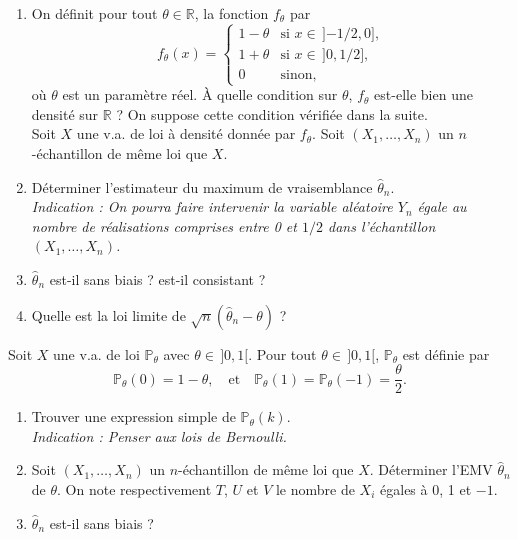 \begin{mdframed}
\begin{exercice}
\begin{enumerate}
    \item On définit pour tout $\theta \in \mathbb{R}$, la fonction $f_\theta$ par
    \begin{equation*}
    f_\theta(x) = \begin{cases}
    1 - \theta & \text{si } x \in \, ]{-1/2}, 0], \\
    1 + \theta & \text{si } x \in \, ]0, 1/2], \\
    0 & \text{sinon},
    \end{cases}
    \end{equation*}
    où $\theta$ est un paramètre réel. À quelle condition sur $\theta$, $f_\theta$ est-elle bien une densité sur $\mathbb{R}$ ? On suppose cette condition vérifiée dans la suite.\\
    Soit $X$ une v.a. de loi à densité donnée par $f_\theta$. Soit $(X_1, \dots, X_n)$ un $n$-échantillon de même loi que $X$.
    
    \item Déterminer l'estimateur du maximum de vraisemblance $\hat{\theta}_n$.\\
    \textit{Indication : On pourra faire intervenir la variable aléatoire $Y_n$ égale au nombre de réalisations comprises entre 0 et $1/2$ dans l'échantillon $(X_1, \dots, X_n)$.}
    
    \item $\hat{\theta}_n$ est-il sans biais ? est-il consistant ?
    \item Quelle est la loi limite de $\sqrt{n}(\hat{\theta}_n - \theta)$ ?
\end{enumerate}
\end{exercice}
\end{mdframed}

\smallskip

\begin{mdframed}
\begin{exercice}
Soit $X$ une v.a. de loi $\mathbb{P}_\theta$ avec $\theta \in \, ]0, 1[$. Pour tout $\theta \in \, ]0, 1[$, $\mathbb{P}_\theta$ est définie par
\begin{equation*}
\mathbb{P}_\theta(0) = 1 - \theta, \quad \text{et} \quad \mathbb{P}_\theta(1) = \mathbb{P}_\theta(-1) = \frac{\theta}{2}.
\end{equation*}
\begin{enumerate}
    \item Trouver une expression simple de $\mathbb{P}_\theta(k)$.\\
    \textit{Indication : Penser aux lois de Bernoulli.}
    \item Soit $(X_1, \dots, X_n)$ un $n$-échantillon de même loi que $X$. Déterminer l'EMV $\hat{\theta}_n$ de $\theta$. On note respectivement $T$, $U$ et $V$ le nombre de $X_i$ égales à 0, 1 et $-1$.
    \item $\hat{\theta}_n$ est-il sans biais ?
\end{enumerate}
\end{exercice}
\end{mdframed}

